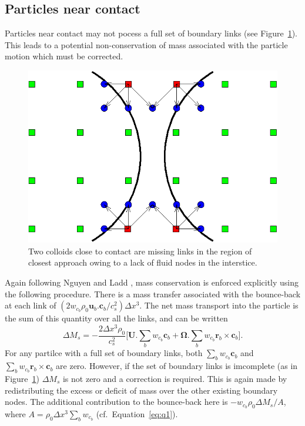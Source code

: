 \subsection{Particles near contact}

Particles near contact may not pocess a full set of boundary
links (see Figure~\ref{fig:f5}). This leads to a potential
non-conservation of mass associated with the particle motion
which must be corrected.


\begin{figure}[tb]
\begin{center}
\includegraphics{xfig/colloidclose.eps}
\end{center}
\caption{Two colloids close to contact are missing links in the
region of closest approach owing to a lack of fluid nodes in the
interstice.}
\label{fig:f5}
\end{figure}
Again following Nguyen and Ladd \cite{nl02}, mass conservation is
enforced explicitly using the following procedure. There is a mass
transfer associated with the bounce-back at each link of
$(2w_{c_b}\rho_0 \mathbf{u}_b . \mathbf{c}_b / c_s^2) \Delta x^3$.
The net mass transport into the particle is the sum of this
quantity over all the links, and can be written
\begin{equation}
\Delta M_s = - \frac{2\Delta x^3 \rho_0}{c_s^2}
\Big[ \mathbf{U}.\sum_b w_{c_b} \mathbf{c}_b +
  \mathbf{\Omega} . \sum_b w_{c_b} \mathbf{r}_b \times \mathbf{c}_b \Big].
\end{equation}
For any partilce with a full set of boundary links, both
$\sum_b w_{c_b} \mathbf{c}_b$
and $\sum_b w_{c_b} \mathbf{r}_b \times \mathbf{c}_b$ are zero.
However, if the set of boundary links is imcomplete
(as in Figure~\ref{fig:f5}) $\Delta M_s$ is not zero and
a correction is required. This is again made by redistributing the
excess or deficit of mass over the other existing boundary nodes.
The additional contribution to the bounce-back here is
$-w_{c_b} \rho_0 \Delta M_s/A$, where
$A = \rho_0 \Delta x^3 \sum_b w_{c_b}$ (cf.\ Equation~\ref{eq:q1}).

